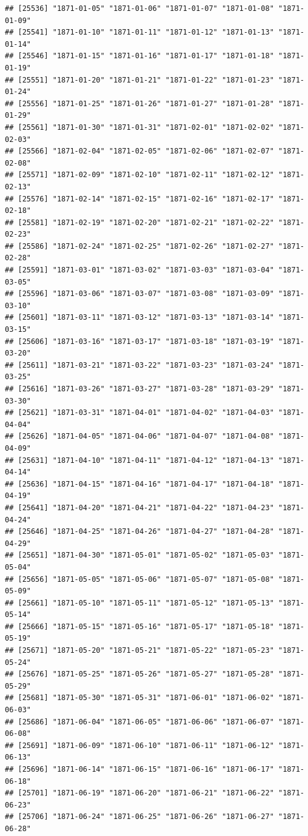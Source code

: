 \documentclass{article}\usepackage[]{graphicx}\usepackage[]{color}
\makeatletter
\newenvironment{kframe}{%
 \def\at@end@of@kframe{}%
 \ifinner\ifhmode%
  \def\at@end@of@kframe{\end{minipage}}%
  \begin{minipage}{\columnwidth}%
 \fi\fi%
 \def\FrameCommand##1{\hskip\@totalleftmargin \hskip-\fboxsep
 \colorbox{shadecolor}{##1}\hskip-\fboxsep
     \hskip-\linewidth \hskip-\@totalleftmargin \hskip\columnwidth}%
 \MakeFramed {\advance\hsize-\width
   \@totalleftmargin\z@ \linewidth\hsize
   \@setminipage}}%
 {\par\unskip\endMakeFramed%
 \at@end@of@kframe}
\newenvironment{knitrout}{}{} %
\makeatother
\begin{document}
\begin{description}
\begin{knitrout}
\begin{kframe}
\begin{verbatim}
## [25536] "1871-01-05" "1871-01-06" "1871-01-07" "1871-01-08" "1871-01-09"
## [25541] "1871-01-10" "1871-01-11" "1871-01-12" "1871-01-13" "1871-01-14"
## [25546] "1871-01-15" "1871-01-16" "1871-01-17" "1871-01-18" "1871-01-19"
## [25551] "1871-01-20" "1871-01-21" "1871-01-22" "1871-01-23" "1871-01-24"
## [25556] "1871-01-25" "1871-01-26" "1871-01-27" "1871-01-28" "1871-01-29"
## [25561] "1871-01-30" "1871-01-31" "1871-02-01" "1871-02-02" "1871-02-03"
## [25566] "1871-02-04" "1871-02-05" "1871-02-06" "1871-02-07" "1871-02-08"
## [25571] "1871-02-09" "1871-02-10" "1871-02-11" "1871-02-12" "1871-02-13"
## [25576] "1871-02-14" "1871-02-15" "1871-02-16" "1871-02-17" "1871-02-18"
## [25581] "1871-02-19" "1871-02-20" "1871-02-21" "1871-02-22" "1871-02-23"
## [25586] "1871-02-24" "1871-02-25" "1871-02-26" "1871-02-27" "1871-02-28"
## [25591] "1871-03-01" "1871-03-02" "1871-03-03" "1871-03-04" "1871-03-05"
## [25596] "1871-03-06" "1871-03-07" "1871-03-08" "1871-03-09" "1871-03-10"
## [25601] "1871-03-11" "1871-03-12" "1871-03-13" "1871-03-14" "1871-03-15"
## [25606] "1871-03-16" "1871-03-17" "1871-03-18" "1871-03-19" "1871-03-20"
## [25611] "1871-03-21" "1871-03-22" "1871-03-23" "1871-03-24" "1871-03-25"
## [25616] "1871-03-26" "1871-03-27" "1871-03-28" "1871-03-29" "1871-03-30"
## [25621] "1871-03-31" "1871-04-01" "1871-04-02" "1871-04-03" "1871-04-04"
## [25626] "1871-04-05" "1871-04-06" "1871-04-07" "1871-04-08" "1871-04-09"
## [25631] "1871-04-10" "1871-04-11" "1871-04-12" "1871-04-13" "1871-04-14"
## [25636] "1871-04-15" "1871-04-16" "1871-04-17" "1871-04-18" "1871-04-19"
## [25641] "1871-04-20" "1871-04-21" "1871-04-22" "1871-04-23" "1871-04-24"
## [25646] "1871-04-25" "1871-04-26" "1871-04-27" "1871-04-28" "1871-04-29"
## [25651] "1871-04-30" "1871-05-01" "1871-05-02" "1871-05-03" "1871-05-04"
## [25656] "1871-05-05" "1871-05-06" "1871-05-07" "1871-05-08" "1871-05-09"
## [25661] "1871-05-10" "1871-05-11" "1871-05-12" "1871-05-13" "1871-05-14"
## [25666] "1871-05-15" "1871-05-16" "1871-05-17" "1871-05-18" "1871-05-19"
## [25671] "1871-05-20" "1871-05-21" "1871-05-22" "1871-05-23" "1871-05-24"
## [25676] "1871-05-25" "1871-05-26" "1871-05-27" "1871-05-28" "1871-05-29"
## [25681] "1871-05-30" "1871-05-31" "1871-06-01" "1871-06-02" "1871-06-03"
## [25686] "1871-06-04" "1871-06-05" "1871-06-06" "1871-06-07" "1871-06-08"
## [25691] "1871-06-09" "1871-06-10" "1871-06-11" "1871-06-12" "1871-06-13"
## [25696] "1871-06-14" "1871-06-15" "1871-06-16" "1871-06-17" "1871-06-18"
## [25701] "1871-06-19" "1871-06-20" "1871-06-21" "1871-06-22" "1871-06-23"
## [25706] "1871-06-24" "1871-06-25" "1871-06-26" "1871-06-27" "1871-06-28"

\end{verbatim}
\end{kframe}
\end{knitrout}
\end{description}
\end{document}
